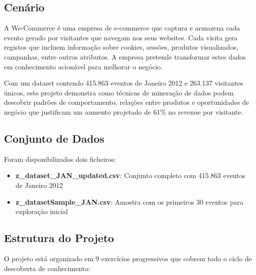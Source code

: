\documentclass[11pt,a4paper]{article}
\begin{document}
\subsection{Cenário}

A We-Commerce é uma empresa de e-commerce que captura e armazena cada evento gerado por visitantes que navegam nos seus websites. Cada visita gera registos que incluem informação sobre cookies, sessões, produtos visualizados, campanhas, entre outros atributos. A empresa pretende transformar estes dados em conhecimento acionável para melhorar o negócio.

Com um dataset contendo 415.863 eventos de Janeiro 2012 e 263.137 visitantes únicos, este projeto demonstra como técnicas de mineração de dados podem descobrir padrões de comportamento, relações entre produtos e oportunidades de negócio que justificam um aumento projetado de 61\% no revenue por visitante.

\subsection{Conjunto de Dados}

Foram disponibilizados dois ficheiros:
\begin{itemize}
    \item \textbf{z\_dataset\_JAN\_updated.csv}: Conjunto completo com 415.863 eventos de Janeiro 2012
    \item \textbf{z\_datasetSample\_JAN.csv}: Amostra com os primeiros 30 eventos para exploração inicial
\end{itemize}

\subsection{Estrutura do Projeto}

O projeto está organizado em 9 exercícios progressivos que cobrem todo o ciclo de descoberta de conhecimento:
\end{document}
